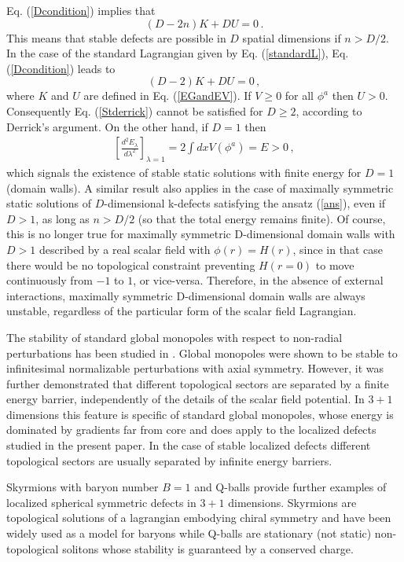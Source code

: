 \documentclass[prd,twocolumn,a4paper,superscriptaddress,floatfix]{revtex4}
\def\be{\begin{equation}}
\def\ee{\end{equation}}
\def\ben{\begin{eqnarray}}
\def\een{\end{eqnarray}}
\begin{document}
Eq. (\ref{Dcondition}) implies that
\be
\label{Stderrick1}
(D-2n) K + D U=0\,.
\ee
This means that stable defects are possible in $D$ spatial dimensions if $n>D/2$. In the case of the standard Lagrangian given by Eq. (\ref{standardL}), Eq. (\ref{Dcondition}) leads to
\be
\label{Stderrick}
(D-2) K + D U=0\,,
\ee
where $K$ and $U$ are defined in Eq. (\ref{EGandEV}). If $V \ge 0$ for all $\phi^a$ then $U>0$. Consequently Eq. (\ref{Stderrick}) cannot be satisfied for $D \ge 2$, according to Derrick's argument. On the other hand, if $D=1$ then
\ben\label{D2condition1}
\left[\frac{d^2 E_\lambda}{d\lambda^2}\right]_{\lambda=1}=2 \int d x  V(\phi^a) = E >0\,,
\een
which signals the existence of stable static solutions with finite energy for $D=1$ (domain walls). A similar result also applies in the case of maximally symmetric static solutions of $D$-dimensional k-defects satisfying the ansatz (\ref{ans}), even if $D>1$, as long as $n>D/2$ (so that the total energy remains finite). Of course, this is no longer true for maximally symmetric D-dimensional domain walls with $D >1$ described by a real scalar field with $\phi(r)=H(r)$, since in that case there would be no topological constraint preventing $H(r=0)$ to move continuously from $-1$ to $1$, or vice-versa. Therefore, in the absence of external interactions, maximally symmetric D-dimensional domain walls are always unstable, regardless of the particular form of the scalar field Lagrangian.

The stability of standard global monopoles with respect to non-radial perturbations has been studied in \cite{1992NuPhB.375..665P,1989PhRvL..63.2158G,1991PhRvL..67.1173R,2000PhRvL..85.3091A,2002PhRvD..66h5019W}. Global monopoles were shown to be stable to infinitesimal normalizable perturbations with axial symmetry. However, it was further demonstrated that different topological sectors are separated by a finite energy barrier, independently of the details of the scalar field potential. In $3+1$ dimensions this feature is specific of standard global monopoles, whose energy is dominated by gradients far from core and does apply to the localized defects studied in the present paper.  In the case of stable localized defects different topological sectors are usually separated by infinite energy barriers.

Skyrmions with baryon number $B=1$ and Q-balls provide further examples of localized spherical symmetric defects in $3+1$ dimensions. Skyrmions \cite{1962NucPh..31..556S} are topological solutions of a lagrangian embodying chiral symmetry and have been widely used as a model for baryons while Q-balls \cite{1985NuPhB.262..263C} are stationary (not static) non-topological solitons whose stability is guaranteed by a conserved charge.
\end{document}
